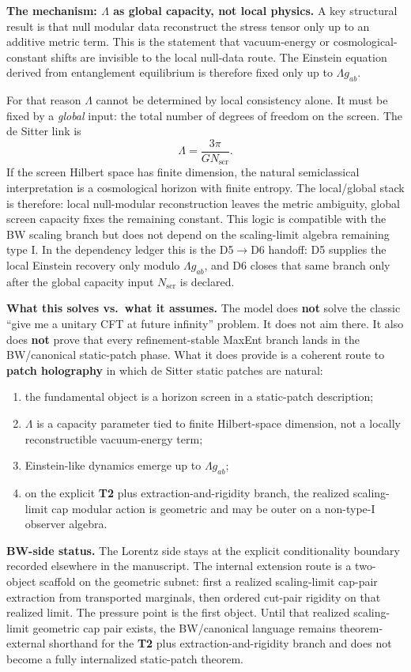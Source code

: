 \textbf{The mechanism: \(\Lambda\) as global capacity, not local physics.} A key structural result is that null modular data reconstruct the stress tensor only up to an additive metric term. This is the statement that vacuum-energy or cosmological-constant shifts are invisible to the local null-data route. The Einstein equation derived from entanglement equilibrium is therefore fixed only up to \(\Lambda g_{ab}\).

For that reason \(\Lambda\) cannot be determined by local consistency alone. It must be fixed by a \emph{global} input: the total number of degrees of freedom on the screen. The de Sitter link is
\[
\Lambda=\frac{3\pi}{G N_{\mathrm{scr}}}.
\]
If the screen Hilbert space has finite dimension, the natural semiclassical interpretation is a cosmological horizon with finite entropy. The local/global stack is therefore: local null-modular reconstruction leaves the metric ambiguity, global screen capacity fixes the remaining constant. This logic is compatible with the BW scaling branch but does not depend on the scaling-limit algebra remaining type I.
In the dependency ledger this is the D5\(\to\)D6 handoff: D5 supplies the local Einstein recovery only modulo \(\Lambda g_{ab}\), and D6 closes that same branch only after the global capacity input \(N_{\mathrm{scr}}\) is declared.

\textbf{What this solves vs.\ what it assumes.} The model does \textbf{not} solve the classic ``give me a unitary CFT at future infinity'' problem. It does not aim there. It also does \textbf{not} prove that every refinement-stable MaxEnt branch lands in the BW/canonical static-patch phase. What it does provide is a coherent route to \textbf{patch holography} in which de Sitter static patches are natural:
\begin{enumerate}
\def\labelenumi{\arabic{enumi}.}
\item
the fundamental object is a horizon screen in a static-patch description;
\item
\(\Lambda\) is a capacity parameter tied to finite Hilbert-space dimension, not a locally reconstructible vacuum-energy term;
\item
Einstein-like dynamics emerge up to \(\Lambda g_{ab}\);
\item
on the explicit \textbf{T2} plus extraction-and-rigidity branch, the realized scaling-limit cap modular action is geometric and may be outer on a non-type-I observer algebra.
\end{enumerate}

\textbf{BW-side status.} The Lorentz side stays at the explicit conditionality boundary recorded elsewhere in the manuscript. The internal extension route is a two-object scaffold on the geometric subnet: first a realized scaling-limit cap-pair extraction from transported marginals, then ordered cut-pair rigidity on that realized limit. The pressure point is the first object. Until that realized scaling-limit geometric cap pair exists, the BW/canonical language remains theorem-external shorthand for the \textbf{T2} plus extraction-and-rigidity branch and does not become a fully internalized static-patch theorem.

